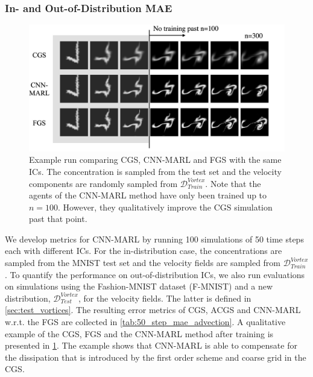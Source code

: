 \documentclass{article}
\theoremstyle{plain}
\theoremstyle{definition}
\theoremstyle{remark}
\begin{document}
\subsubsection{In- and Out-of-Distribution MAE}
\begin{figure}[ht]
\vskip 0.2in
\begin{center}
\centerline{\includegraphics[width=\columnwidth]{illustrations/advection/mnist_train_illustration.png}}
\caption{Example run comparing CGS, CNN-MARL and FGS with the same ICs. The concentration is sampled from the test set and the velocity components are randomly sampled from $\mathcal D^{Vortex}_{Train}$. Note that the agents of the CNN-MARL method have only been trained up to $n=100$. However, they qualitatively improve the CGS simulation past that point.}
\label{fig:advection_example}
\end{center}
\vskip -0.2in
\end{figure}
We develop  metrics for CNN-MARL by running 100 simulations of 50 time steps each with different ICs. For the in-distribution case, the concentrations are sampled from the MNIST test set and the velocity fields are sampled from $\mathcal D^{Vortex}_{Train}$. To quantify the performance on out-of-distribution ICs, we also run evaluations on simulations using the Fashion-MNIST dataset (F-MNIST) \cite{fashionmnist} and a new distribution, $\mathcal D^{Vortex}_{Test}$, for the velocity fields. The latter is defined in \cref{sec:test_vortices}. The resulting error metrics of CGS, ACGS and CNN-MARL w.r.t. the FGS are collected in \cref{tab:50_step_mae_advection}. A qualitative example of the CGS, FGS and the CNN-MARL method after training is presented in \cref{fig:advection_example}. The example shows that CNN-MARL is able to compensate for the dissipation  that is introduced by the first order scheme and coarse grid in the CGS.
\end{document}
